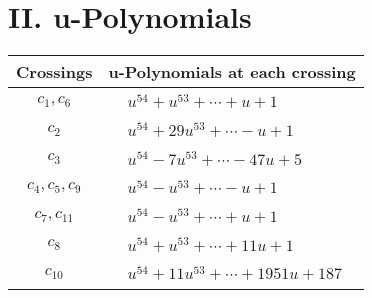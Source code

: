 \documentclass[1p]{elsarticle_modified}
\theoremstyle{definition}
\begin{document}
\newpage\renewcommand{\arraystretch}{1}
\centering \section*{ II. u-Polynomials}
\begin{tabular}{m{50pt}|m{274pt}}
Crossings & \hspace{64pt}u-Polynomials at each crossing \\
\hline $$\begin{aligned}c_{1},c_{6}\end{aligned}$$&$\begin{aligned}
&u^{54}+u^{53}+\cdots+u+1
\end{aligned}$\\
\hline $$\begin{aligned}c_{2}\end{aligned}$$&$\begin{aligned}
&u^{54}+29 u^{53}+\cdots- u+1
\end{aligned}$\\
\hline $$\begin{aligned}c_{3}\end{aligned}$$&$\begin{aligned}
&u^{54}-7 u^{53}+\cdots-47 u+5
\end{aligned}$\\
\hline $$\begin{aligned}c_{4},c_{5},c_{9}\end{aligned}$$&$\begin{aligned}
&u^{54}- u^{53}+\cdots- u+1
\end{aligned}$\\
\hline $$\begin{aligned}c_{7},c_{11}\end{aligned}$$&$\begin{aligned}
&u^{54}- u^{53}+\cdots+u+1
\end{aligned}$\\
\hline $$\begin{aligned}c_{8}\end{aligned}$$&$\begin{aligned}
&u^{54}+u^{53}+\cdots+11 u+1
\end{aligned}$\\
\hline $$\begin{aligned}c_{10}\end{aligned}$$&$\begin{aligned}
&u^{54}+11 u^{53}+\cdots+1951 u+187
\end{aligned}$\\
\hline
\end{tabular}\newpage\renewcommand{\arraystretch}{1}
\end{document}
